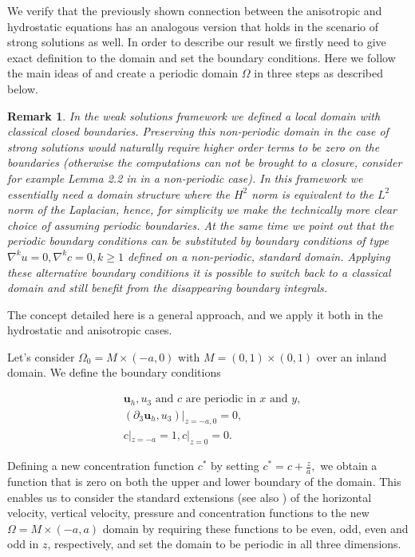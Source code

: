 \documentclass[12pt]{report}
\numberwithin{theorem}{chapter}
\numberwithin{corollary}{chapter}
\numberwithin{lemma}{chapter}
\newtheorem{remark}{Remark}
\numberwithin{remark}{chapter}
\numberwithin{definition}{chapter}
\numberwithin{prop}{chapter}
\begin{document}
We verify that the previously shown connection between the anisotropic and hydrostatic equations has an analogous version that holds in the scenario of strong solutions as well. In order to describe our result we firstly need to give exact definition to the domain and set the boundary conditions. Here we follow the main ideas of \cite{cao2014local} and create a periodic domain $\Omega$ in three steps as described below.

\begin{remark}
\normalfont In the weak solutions framework we defined a local domain with classical closed boundaries. Preserving this non-periodic domain in the case of strong solutions would naturally require higher order terms to be zero on the boundaries (otherwise the computations can not be brought to a closure, consider for example Lemma 2.2 in \cite{li2019primitive} in a non-periodic case). In this framework we essentially need a domain structure where the $H^2$ norm is equivalent to the $L^2$ norm of the Laplacian, hence, for simplicity we make the technically more clear choice of assuming periodic boundaries. At the same time we point out that the periodic boundary conditions can be substituted by boundary conditions of type $\nabla^k u = 0, \nabla^k c = 0, k \geq 1$ defined on a non-periodic, standard domain. Applying these alternative boundary conditions it is possible to switch back to a classical domain and still benefit from the disappearing boundary integrals.
\end{remark}

The concept detailed here is a general approach, and we apply it both in the hydrostatic and anisotropic cases.

Let's consider $\Omega_0 = M \times (-a, 0)$ with $M = (0,1) \times (0,1)$ over an inland domain. We define the boundary conditions

\begin{equation}
  \begin{split}
    & \mathbf{u}_h, u_3 \text{ and } c \text{ are periodic in } x \text{ and } y, \\
    & (\partial_3 \mathbf{u}_h, u_3) | _{z = -a, 0} = 0, \\
    & c |_{z = -a} = 1, c |_{z = 0} = 0.
  \end{split}
\end{equation}

Defining a new concentration function $c^*$ by setting $c^* = c + \frac{z}{a},$ we obtain a function that is zero on both the upper and lower boundary of the domain. This enables us to consider the standard extensions (see also \cite{li2019primitive}) of the horizontal velocity, vertical velocity, pressure and concentration functions to the new $\Omega = M \times (-a, a)$ domain by requiring these functions to be even, odd, even and odd in $z$, respectively, and set the domain to be periodic in all three dimensions.
\end{document}
